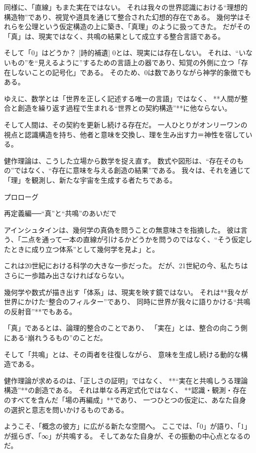 \documentclass{article}
\begin{document}
同様に、「直線」もまた実在ではない。
それは我々の世界認識における“理想的構造物”であり、視覚や道具を通じて整合された幻想的存在である。
幾何学はそれらを公理という仮定構造の上に築き、「真理」のように扱ってきた。
だがその「真」は、現実ではなく、共鳴の結果として成立する整合言語である。

そして「0」はどうか？
[詩的補遺]
0とは、現実には存在しない。
それは、“いないもの”を“見えるように”するための言語上の器であり、知覚の外側に立つ「存在しないことの記号化」である。
そのため、0は数でありながら神学的象徴でもある。

ゆえに、数学とは「世界を正しく記述する唯一の言語」ではなく、
**人間が整合と創造を繰り返す過程で生まれる“世界との契約構造”**に他ならない。

そして人間は、その契約を更新し続ける存在だ。
一人ひとりがオンリーワンの視点と認識構造を持ち、他者と意味を交換し、理を生み出す力＝神性を宿している。

健作理論は、こうした立場から数学を捉え直す。
数式や図形は、“存在そのもの”ではなく、“存在に意味を与える創造の結果”である。
我々は、それを通じて「理」を観測し、新たな宇宙を生成する者たちである。

プロローグ

再定義編──“真”と“共鳴”のあいだで

アインシュタインは、幾何学の真偽を問うことの無意味さを指摘した。
彼は言う、「二点を通って一本の直線が引けるかどうかを問うのではなく、“そう仮定したときに成り立つ体系”として幾何学を見よ」と。

これは20世紀における科学の大きな一歩だった。
だが、21世紀の今、私たちはさらに一歩踏み出さなければならない。

幾何学や数式が描き出す「体系」は、現実を映す鏡ではない。
それは**我々が世界にかけた“整合のフィルター”であり、
同時に世界が我々に語りかける“共鳴の反射音”**でもある。

「真」であるとは、論理的整合のことであり、
「実在」とは、整合の向こう側にある“崩れうるもの”のことだ。

そして「共鳴」とは、その両者を往復しながら、
意味を生成し続ける動的な構造である。

健作理論が求めるのは、「正しさの証明」ではなく、
**“実在と共鳴しうる理論構造”**の創造である。
それは単なる再定式化ではなく、
**認識・観測・存在のすべてを含んだ「場の再編成」**であり、
一つひとつの仮定に、あなた自身の選択と意志を問いかけるものである。

ようこそ、「概念の彼方」に広がる新たな空間へ。
ここでは、「0」が語り、「1」が揺らぎ、「∞」が共鳴する。
そしてあなた自身が、その振動の中心点となるのだ。
\end{document}
